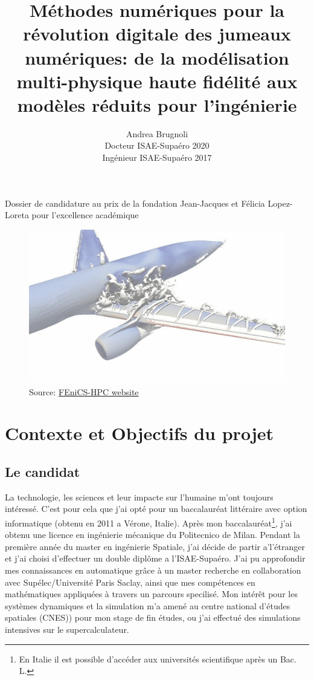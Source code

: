 \documentclass[french]{article}
\author{Andrea Brugnoli \\ 
\hspace{2.8pt} Docteur ISAE-Supaéro 2020\\
Ingénieur ISAE-Supaéro 2017}
\title{Méthodes numériques pour la révolution digitale des jumeaux numériques: de la modélisation multi-physique haute fidélité aux modèles réduits pour l'ingénierie}
\date{}
\begin{document}
\maketitle

\large{Dossier de candidature au prix de la fondation Jean-Jacques et Félicia
	Lopez-Loreta pour l’excellence académique}


\begin{figure}[h]
	\centering
	\includegraphics[width=.95\textwidth]{3Dplane.jpg}
	\captionsetup{labelformat=empty}
	\caption{Source: \href{http://www.fenics-hpc.org/}{FEniCS-HPC website}}
\end{figure}





\thispagestyle{empty}

\newpage

\section{Contexte et Objectifs du projet}

\subsection{Le candidat}
La technologie,  les sciences et leur impacte sur l'humaine m'ont toujours intéressé. C'est pour cela que j'ai opté pour un baccalauréat littéraire avec option informatique (obtenu en 2011 a Vérone, Italie). Après mon baccalauréat\footnote{En Italie il est possible d'accéder aux universités scientifique après un Bac. L.}, j'ai obtenu une licence en ingénierie mécanique du Politecnico de Milan. Pendant la première année du master en ingénierie Spatiale, j'ai décide de partir a'l'étranger et j'ai choisi d'effectuer un double diplôme a l'ISAE-Supaéro. J'ai pu approfondir mes connaissances en automatique grâce \`a un master recherche en collaboration avec Supélec/Université Paris Saclay, ainsi que mes compétences en mathématiques appliquées \`a travers un parcours specilis\'e. Mon intérêt pour les systèmes dynamiques et la simulation m'a amené au centre national d'études spatiales (CNES)) pour mon stage de fin études, ou j'ai effectué des simulations intensives sur le supercalculateur. \\
\end{document}
